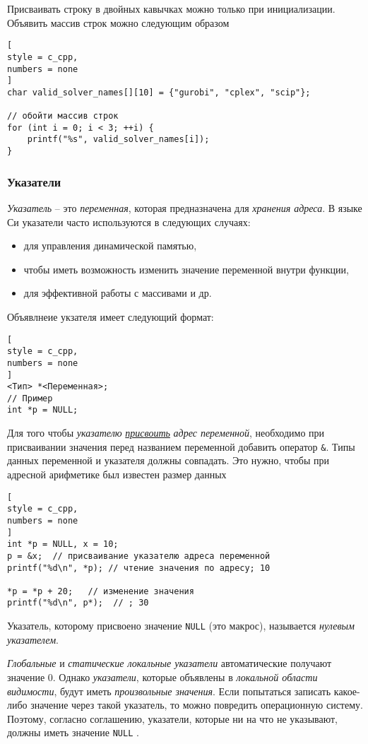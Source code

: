\documentclass[%
	11pt,
	a4paper,
	utf8,
		]{article}
\begin{document}
Присваивать строку в двойных кавычках можно только при инициализации. Объявить массив строк можно следующим образом
\begin{lstlisting}[
style = c_cpp,
numbers = none
]
char valid_solver_names[][10] = {"gurobi", "cplex", "scip"};

// обойти массив строк
for (int i = 0; i < 3; ++i) {
    printf("%s", valid_solver_names[i]);
}
\end{lstlisting}

\subsubsection{Указатели}

\emph{Указатель} -- это \emph{переменная}, которая предназначена для \emph{хранения адреса}. В языке Си указатели часто используются в следующих случаях:
\begin{itemize}
	\item для управления динамической памятью,
	
	\item чтобы иметь возможность изменить значение переменной внутри функции,
	
	\item для эффективной работы с массивами и др.
\end{itemize}

Объявлнеие укзателя имеет следующий формат:
\begin{lstlisting}[
style = c_cpp,
numbers = none
]
<Тип> *<Переменная>;
// Пример
int *p = NULL;
\end{lstlisting}

Для того чтобы \emph{указателю} \underline{\itshape присвоить} \emph{адрес переменной}, необходимо при присваивании значения перед названием переменной добавить оператор \verb*|&|. Типы данных переменной и указателя должны совпадать. Это нужно, чтобы при адресной арифметике был известен размер данных
\begin{lstlisting}[
style = c_cpp,
numbers = none
]
int *p = NULL, x = 10;
p = &x;  // присваивание указателю адреса переменной
printf("%d\n", *p); // чтение значения по адресу; 10

*p = *p + 20;   // изменение значения
printf("%d\n", p*);  // ; 30
\end{lstlisting}

Указатель, которому присвоено значение \verb|NULL| (это макрос), называется \emph{нулевым указателем}.

\emph{Глобальные} и \emph{статические локальные указатели} автоматические получают значение 0. Однако \emph{указатели}, которые объявлены в \emph{локальной области видимости}, будут иметь \emph{\color{red}произвольные значения}. Если попытаться записать какое-либо значение через такой указатель, то можно повредить операционную систему. Поэтому, согласно соглашению, указатели, которые ни на что не указывают, должны иметь значение \verb*|NULL| \cite[]{prokhorenok-prog-c:2020}.
\end{document}
